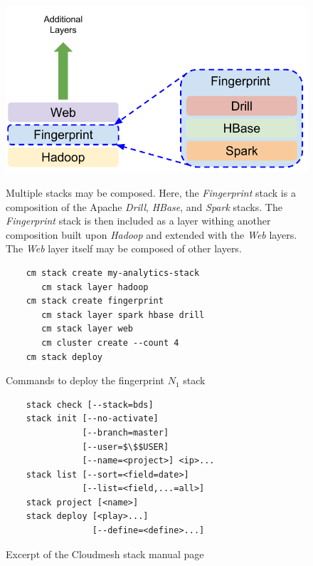 \begin{figure}
\centering
\includegraphics[width=1\columnwidth]{images/cloudmesh-stack-composition.pdf}
\caption{Multiple stacks may be composed. Here, the
  {\it Fingerprint} stack is a composition of the Apache
  {\it Drill}, {\it HBase}, and {\it Spark}
  stacks. The {\it Fingerprint} stack is then included as a layer withing
  another composition built upon {\it Hadoop} and extended with the
  {\it Web} layers. The {\it Web} layer itself may be composed
  of other layers.
  \label{F:stack-composition}}

\begin{Verbatim}
    cm stack create my-analytics-stack
       cm stack layer hadoop
    cm stack create fingerprint
       cm stack layer spark hbase drill
       cm stack layer web
       cm cluster create --count 4
    cm stack deploy
\end{Verbatim}
\vspace{-12pt}
\caption{Commands to deploy the fingerprint $N_1$ stack}

\begin{Verbatim}
    stack check [--stack=bds]
    stack init [--no-activate] 
               [--branch=master] 
               [--user=$\$$USER] 
               [--name=<project>] <ip>...
    stack list [--sort=<field=date>] 
               [--list=<field,...=all>]
    stack project [<name>]
    stack deploy [<play>...] 
                 [--define=<define>...]
\end{Verbatim}
\vspace{-12pt}
\caption{Excerpt of the Cloudmesh stack manual page}
\label{F:cm-stack-command}
\end{figure}


